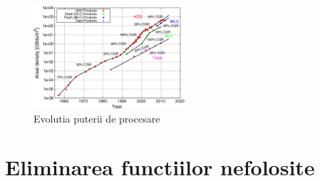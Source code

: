 \begin{figure}
  \centering
  \includegraphics[width=0.5\textwidth]{memory_trends}
  \caption{Evolutia puterii de procesare\cite{memory_trends} }
  \label{fig:memory_trends}
\end{figure}

\section{Eliminarea functiilor nefolosite}
